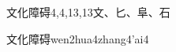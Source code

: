 \begin{entry}{文化障碍}{4,4,13,13}{⽂、⼔、⾩、⽯}
  \begin{phonetics}{文化障碍}{wen2hua4zhang4'ai4}
  \end{phonetics}
\end{entry}
